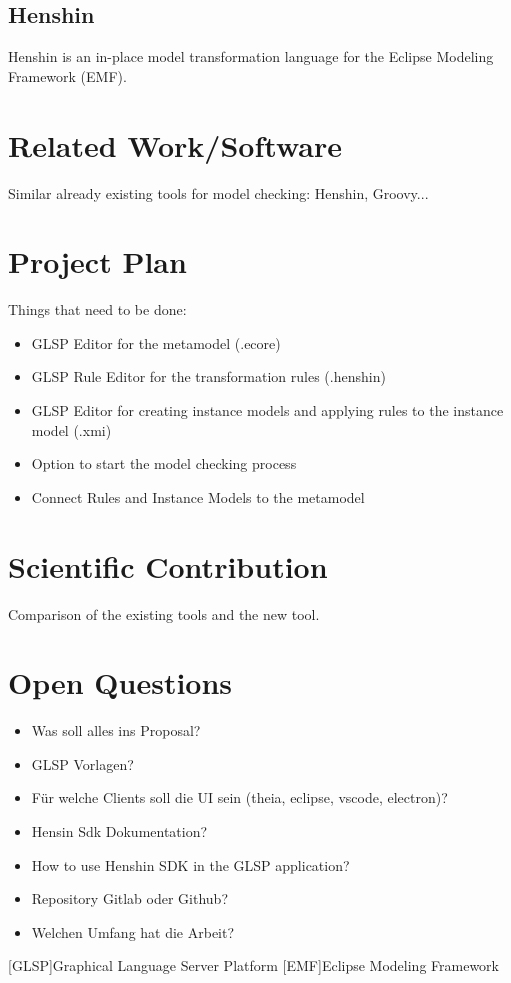\documentclass[conference,onecolumn]{IEEEtran}
\begin{document}
  \subsection{Henshin}
  \label{subsec:henshin}
  Henshin is an in-place model transformation language for the Eclipse Modeling Framework (EMF).
  \cite{henshin-repo}

  \section{Related Work/Software}
  \label{sec:related-work}

  Similar already existing tools for model checking: Henshin, Groovy...

  \section{Project Plan}
  \label{sec:project-plan}

  Things that need to be done:

  \begin{itemize}
    \item GLSP Editor for the metamodel (.ecore)
    \item GLSP Rule Editor for the transformation rules (.henshin)
    \item GLSP Editor for creating instance models and applying rules to the instance model (.xmi)
    \item Option to start the model checking process
    \item Connect Rules and Instance Models to the metamodel
  \end{itemize}

  \section{Scientific Contribution}
  \label{sec:scientific-contribution}

  Comparison of the existing tools and the new tool.

  \section{Open Questions}

  \begin{itemize}
    \item Was soll alles ins Proposal?
    \item GLSP Vorlagen?
    \item Für welche Clients soll die UI sein (theia, eclipse, vscode, electron)?
    \item Hensin Sdk Dokumentation?
    \item How to use Henshin SDK in the GLSP application?
    \item Repository Gitlab oder Github?
    \item Welchen Umfang hat die Arbeit?

  \end{itemize}



  \printbibliography

  \begin{acronym}
    [GLSP]{Graphical Language Server Platform}
    [EMF]{Eclipse Modeling Framework}

  \end{acronym}
\end{document}
